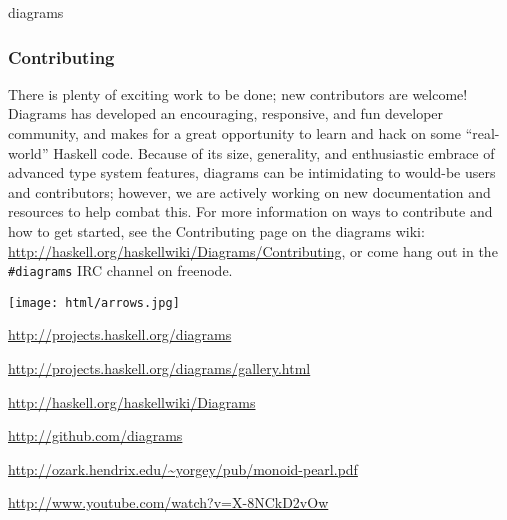 \begin{hcarentry}{diagrams}
\subsubsection*{Contributing}

There is plenty of exciting work to be done; new contributors are welcome!
Diagrams has developed an encouraging, responsive, and fun developer
community, and makes for a great opportunity to learn and hack on some
``real-world'' Haskell code. Because of its size, generality, and enthusiastic
embrace of advanced type system features, diagrams can be intimidating to
would-be users and contributors; however, we are actively working on new
documentation and resources to help combat this. For more information on ways
to contribute and how to get started, see the Contributing page on the
diagrams wiki: \url{http://haskell.org/haskellwiki/Diagrams/Contributing}, or
come hang out in the \texttt{\#diagrams} IRC channel on freenode.

\begin{center}
\texttt{[image: html/arrows.jpg]}
\end{center}

\FurtherReading
\begin{compactitem}
\item \url{http://projects.haskell.org/diagrams}
\item \url{http://projects.haskell.org/diagrams/gallery.html}
\item \url{http://haskell.org/haskellwiki/Diagrams}
\item \url{http://github.com/diagrams}
\item \url{http://ozark.hendrix.edu/~yorgey/pub/monoid-pearl.pdf}
\item \url{http://www.youtube.com/watch?v=X-8NCkD2vOw}
\end{compactitem}
\end{hcarentry}
